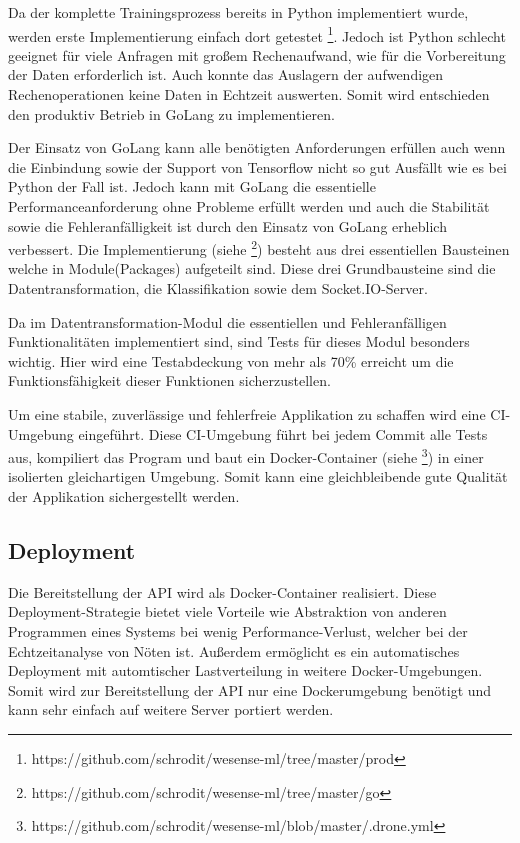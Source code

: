         Da der komplette Trainingsprozess bereits in Python implementiert wurde, werden erste Implementierung einfach dort getestet \footnote{https://github.com/schrodit/wesense-ml/tree/master/prod}.
        Jedoch ist Python schlecht geeignet für viele Anfragen mit großem Rechenaufwand, wie für die Vorbereitung der Daten erforderlich ist.
        Auch konnte das Auslagern der aufwendigen Rechenoperationen keine Daten in Echtzeit auswerten.
        Somit wird entschieden den produktiv Betrieb in GoLang zu implementieren.
        \newline

        Der Einsatz von GoLang kann alle benötigten Anforderungen erfüllen auch wenn die Einbindung sowie der Support von Tensorflow nicht so gut Ausfällt wie es bei Python der Fall ist.
        Jedoch kann mit GoLang die essentielle Performanceanforderung ohne Probleme erfüllt werden und auch die Stabilität sowie die Fehleranfälligkeit ist durch den Einsatz von GoLang erheblich verbessert.
        Die Implementierung (siehe \footnote{https://github.com/schrodit/wesense-ml/tree/master/go}) besteht aus drei essentiellen Bausteinen welche in Module(Packages) aufgeteilt sind.
        Diese drei Grundbausteine sind die Datentransformation, die Klassifikation sowie dem Socket.IO-Server.
        \newline

        Da im Datentransformation-Modul die essentiellen und Fehleranfälligen Funktionalitäten implementiert sind, sind Tests für dieses Modul besonders wichtig.
        Hier wird eine Testabdeckung von mehr als 70\% erreicht um die Funktionsfähigkeit dieser Funktionen sicherzustellen.
        \newline

        Um eine stabile, zuverlässige und fehlerfreie Applikation zu schaffen wird eine \ac{CI}-Umgebung eingeführt.
        Diese \ac{CI}-Umgebung führt bei jedem Commit alle Tests aus, kompiliert das Program und baut ein Docker-Container (siehe \footnote{https://github.com/schrodit/wesense-ml/blob/master/.drone.yml}) in einer isolierten gleichartigen Umgebung.
        Somit kann eine gleichbleibende gute Qualität der Applikation sichergestellt werden.
    
    \subsection{Deployment}
        Die Bereitstellung der API wird als Docker-Container realisiert.
        Diese Deployment-Strategie bietet viele Vorteile wie Abstraktion von anderen Programmen eines Systems bei wenig Performance-Verlust, welcher bei der Echtzeitanalyse von Nöten ist.
        Außerdem ermöglicht es ein automatisches Deployment mit automtischer Lastverteilung in weitere Docker-Umgebungen.
        Somit wird zur Bereitstellung der API nur eine Dockerumgebung benötigt und kann sehr einfach auf weitere Server portiert werden.
                

